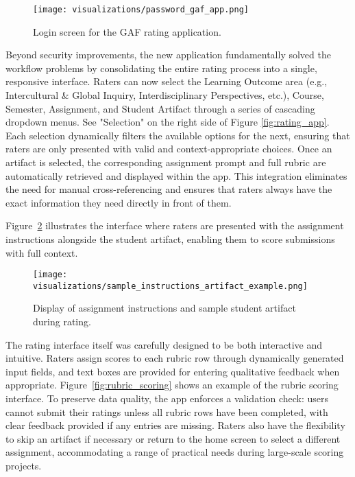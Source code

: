 \documentclass[12pt]{article}%
\begin{document}
\begin{figure}[h]
    \centering
    \texttt{[image: visualizations/password\_gaf\_app.png]}
    \caption{Login screen for the GAF rating application.}
    \label{fig:password_gaf_app}
\end{figure}

Beyond security improvements, the new application fundamentally solved the workflow problems by consolidating the entire rating process into a single, responsive interface. Raters can now select the Learning Outcome area (e.g., Intercultural \& Global Inquiry, Interdisciplinary Perspectives, etc.), Course, Semester, Assignment, and Student Artifact through a series of cascading dropdown menus. See "Selection" on the right side of Figure  \ref{fig:rating_app}. Each selection dynamically filters the available options for the next, ensuring that raters are only presented with valid and context-appropriate choices. Once an artifact is selected, the corresponding assignment prompt and full rubric are automatically retrieved and displayed within the app. This integration eliminates the need for manual cross-referencing and ensures that raters always have the exact information they need directly in front of them.

Figure~\ref{fig:sample_instructions_artifact_example} illustrates the interface where raters are presented with the assignment instructions alongside the student artifact, enabling them to score submissions with full context.

\begin{figure}[h]
    \centering
    \texttt{[image: visualizations/sample\_instructions\_artifact\_example.png]}
    \caption{Display of assignment instructions and sample student artifact during rating.}
    \label{fig:sample_instructions_artifact_example}
\end{figure}

The rating interface itself was carefully designed to be both interactive and intuitive. Raters assign scores to each rubric row through dynamically generated input fields, and text boxes are provided for entering qualitative feedback when appropriate. Figure~\ref{fig:rubric_scoring} shows an example of the rubric scoring interface. To preserve data quality, the app enforces a validation check: users cannot submit their ratings unless all rubric rows have been completed, with clear feedback provided if any entries are missing. Raters also have the flexibility to skip an artifact if necessary or return to the home screen to select a different assignment, accommodating a range of practical needs during large-scale scoring projects.
\end{document}
